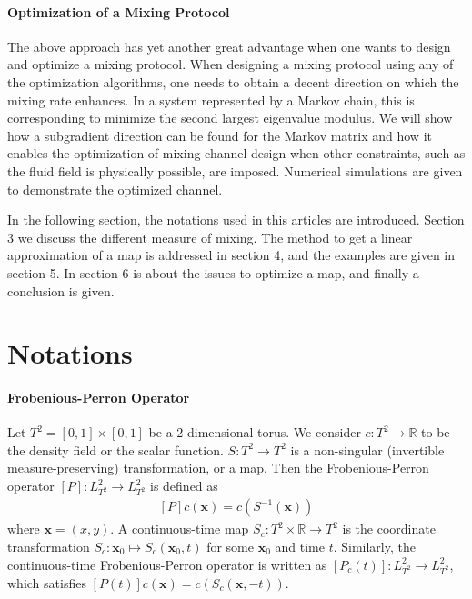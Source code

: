 \documentclass{article}
\begin{document}
\paragraph{Optimization of a Mixing Protocol}
The above approach has yet another great advantage when one wants to
design and optimize a mixing protocol. When designing a mixing
protocol using any of the optimization algorithms, one needs to
obtain a decent direction on which the mixing rate enhances. In a
system represented by a Markov chain, this is corresponding to
minimize the second largest eigenvalue modulus. We will show how a
subgradient direction can be found for the Markov matrix and how it
enables the optimization of mixing channel design when other
constraints, such as the fluid field is physically possible, are
imposed. Numerical simulations are given to demonstrate the
optimized channel.

In the following section, the notations used in this articles are introduced. Section 3 we discuss the different measure of mixing. The method to get a linear approximation of a map is addressed in section 4, and the examples are given in section 5. In section 6 is about the issues to optimize a map, and finally a conclusion is given.






\section{Notations}
\label{Notations}
\paragraph{Frobenious-Perron Operator}
Let $T^2 =[0,1]\times[0,1]$ be a 2-dimensional torus. We consider
$c:T^2 \rightarrow \mathbb{R}$ to be the density field or the scalar
function. $S:T^2\rightarrow T^2$ is a non-singular (invertible
measure-preserving) transformation, or a map. Then the
Frobenious-Perron operator $[P]:L_{T^2}^2\rightarrow L_{T^2}^2$ is
defined as
\begin{eqnarray}
\label{FPoperator}
  [P]c(\mathbf{x})=c(S^{-1}(\mathbf{x}))
\end{eqnarray}
where $\mathbf{x}=(x,y)$. A continuous-time map $S_c: T^2 \times
\mathbb{R} \rightarrow T^2$ is the coordinate transformation $S_c:
\mathbf{x}_0 \mapsto S_c(\mathbf{x}_0,t) $ for some $\mathbf{x}_0$
and time $t$. Similarly, the continuous-time Frobenious-Perron
operator is written as $[P_c(t)]:L_{T^2}^2\rightarrow L_{T^2}^2$,
which satisfies $[P(t)]c(\mathbf{x}) = c(S_c(\mathbf{x},-t))$.
\end{document}
